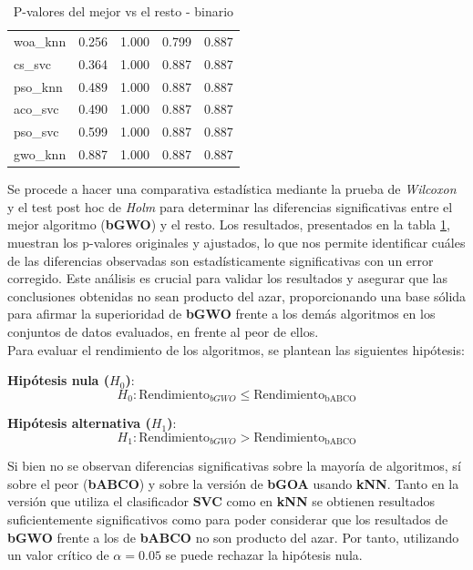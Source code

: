 \begin{table}[htp]
\begin{tabular}{lllll}
        woa\_knn   & 0.256     & 1.000          & 0.799          & 0.887          \\
        cs\_svc    & 0.364     & 1.000          & 0.887          & 0.887          \\
        pso\_knn   & 0.489     & 1.000          & 0.887          & 0.887          \\
        aco\_svc   & 0.490     & 1.000          & 0.887          & 0.887          \\
        pso\_svc   & 0.599     & 1.000          & 0.887          & 0.887          \\
        gwo\_knn   & 0.887     & 1.000          & 0.887          & 0.887          \\
        \bottomrule
    \end{tabular}
    \caption{P-valores del mejor vs el resto - binario}
    \label{tab:p-valus_gwo_vs_rest}
\end{table}

Se procede a hacer una comparativa estadística mediante la prueba de \textit{Wilcoxon} y el test post hoc de \textit{Holm} para determinar las diferencias significativas entre el mejor algoritmo (\textbf{bGWO}) y el resto. Los resultados, presentados en la tabla \ref{tab:p-valus_gwo_vs_rest}, muestran los p-valores originales y ajustados, lo que nos permite identificar cuáles de las diferencias observadas son estadísticamente significativas con un error corregido. Este análisis es crucial para validar los resultados y asegurar que las conclusiones obtenidas no sean producto del azar, proporcionando una base sólida para afirmar la superioridad de \textbf{bGWO} frente a los demás algoritmos en los conjuntos de datos evaluados, en frente al peor de ellos.\\[6pt]

Para evaluar el rendimiento de los algoritmos, se plantean las siguientes hipótesis:

\textbf{Hipótesis nula (\(H_0\))}:
\begin{equation}
    H_0: \text{Rendimiento}_{bGWO} \leq \text{Rendimiento}_{\text{bABCO}}
\end{equation}

\textbf{Hipótesis alternativa (\(H_1\))}:
\begin{equation}
    H_1: \text{Rendimiento}_{bGWO} > \text{Rendimiento}_{\text{bABCO}}
\end{equation}

Si bien no se observan diferencias significativas sobre la mayoría de algoritmos, sí sobre el peor (\textbf{bABCO}) y sobre la versión de \textbf{bGOA} usando \textbf{kNN}. Tanto en la versión que utiliza el clasificador \textbf{SVC} como en \textbf{kNN} se obtienen resultados suficientemente significativos como para poder considerar que los resultados de \textbf{bGWO} frente a los de \textbf{bABCO} no son producto del azar. Por tanto, utilizando un valor crítico de $\alpha=0.05$ se puede rechazar la hipótesis nula.

